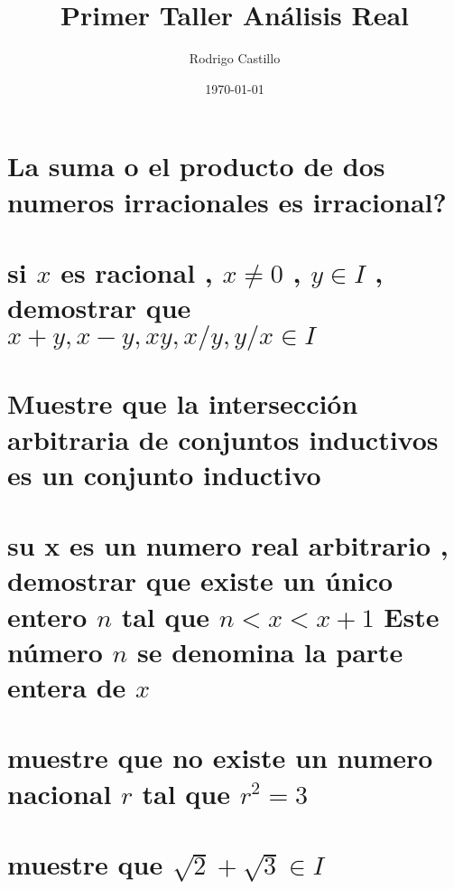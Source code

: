 \documentclass[10pt,a4paper]{article} %
\begin{document}
    \title{{  Primer Taller Análisis Real  }}
    \author{{Rodrigo Castillo}}
    \date{\today}

    \maketitle


    \section{La suma o el producto de dos numeros irracionales es irracional?}

    \section{si $x$ es racional , $x \not= 0$ , $y \in I$ , demostrar que $x+y
    , x-y , xy , x/y , y/x \in I $ }

    \section{Muestre que la intersección arbitraria de conjuntos inductivos es
    un conjunto inductivo}

    \section{su x es un numero real arbitrario , demostrar que existe un único
    entero $n$ tal que $n<x<x+1$ Este número $n$ se denomina la parte entera de
    $x$ }

    \section{muestre que no existe un numero nacional $r$ tal que $r ^{2} = 3$}

    \section{muestre que $\sqrt{2} + \sqrt{3} \in I$}
























    \nocite{*}
    
    
\end{document}
